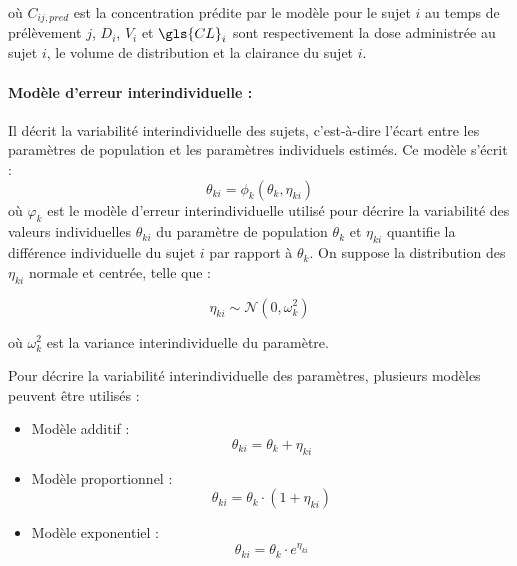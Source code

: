 où $C_{ij,pred}$ est la concentration prédite par le modèle pour le sujet $i$ au temps de prélèvement $j$, $D_i$, $V_i$ et $\gls{CL}_i$ sont respectivement la dose administrée au sujet $i$, le volume de distribution et la clairance du sujet $i$.

\paragraph*{Modèle d'erreur interindividuelle :} Il décrit la variabilité interindividuelle des sujets, c'est-à-dire l'écart entre les paramètres de population et les paramètres individuels estimés. Ce modèle s'écrit :
\begin{equation}
\theta_{ki} = \phi_{k} \left(\theta_k , \eta_{ki} \right)
\label{eq:38}
\end{equation}
où $\varphi_k$ est le modèle d'erreur interindividuelle utilisé pour décrire la variabilité des valeurs individuelles $\theta_{ki}$ du paramètre de population $\theta_k$ et  $\eta_{ki}$ quantifie la différence individuelle du sujet $i$ par rapport à $\theta_k$. On suppose la distribution des $\eta_{ki}$ normale et centrée, telle que :

\begin{equation}
\eta_{ki} \sim \mathcal{N}\left(0,  \omega^2_k \right)
\label{eq:39}
\end{equation}

où $\omega_k^2$ est la variance interindividuelle du paramètre.

Pour décrire la variabilité interindividuelle des paramètres, plusieurs modèles peuvent être utilisés :

\begin{itemize}
\item Modèle additif :
\begin{equation}
\theta_{ki} = \theta_{k} + \eta_{ki} 
\label{eq:40}
\end{equation}

\item Modèle proportionnel :
\begin{equation}
\theta_{ki} = \theta_{k} \cdot \left(1 + \eta_{ki} \right) 
\label{eq:41}
\end{equation}

\item Modèle exponentiel :
\begin{equation}
\theta_{ki} = \theta_{k} \cdot e^{\eta_{ki}} 
\label{eq:42}
\end{equation}
 
\end{itemize}

